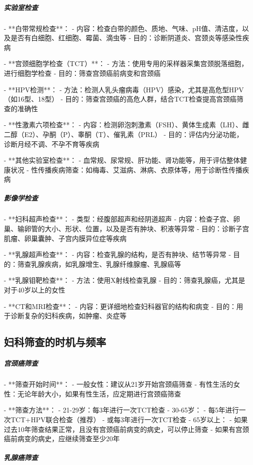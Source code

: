 \begin{enumerate}
\subparagraph{实验室检查}

- **白带常规检查**：
  - 内容：检查白带的颜色、质地、气味、pH值、清洁度，以及是否有白细胞、红细胞、霉菌、滴虫等
  - 目的：诊断阴道炎、宫颈炎等感染性疾病

- **宫颈细胞学检查（TCT）**：
  - 方法：使用专用的采样器采集宫颈脱落细胞，进行细胞学检查
  - 目的：筛查宫颈癌前病变和宫颈癌

- **HPV检测**：
  - 方法：检测人乳头瘤病毒（HPV）感染，尤其是高危型HPV（如16型、18型）
  - 目的：筛查宫颈癌的高危人群，结合TCT检查提高宫颈癌筛查的准确性

- **性激素六项检查**：
  - 内容：检测卵泡刺激素（FSH）、黄体生成素（LH）、雌二醇（E2）、孕酮（P）、睾酮（T）、催乳素（PRL）
  - 目的：评估内分泌功能，诊断月经不调、不孕不育等疾病

- **其他实验室检查**：
  - 血常规、尿常规、肝功能、肾功能等，用于评估整体健康状况
  - 性传播疾病筛查：如梅毒、艾滋病、淋病、衣原体等，用于诊断性传播疾病

\subparagraph{影像学检查}

- **妇科超声检查**：
  - 类型：经腹部超声和经阴道超声
  - 内容：检查子宫、卵巢、输卵管的大小、形状、位置，以及是否有肿块、积液等异常
  - 目的：诊断子宫肌瘤、卵巢囊肿、子宫内膜异位症等疾病

- **乳腺超声检查**：
  - 内容：检查乳腺的结构，是否有肿块、结节等异常
  - 目的：筛查乳腺疾病，如乳腺增生、乳腺纤维腺瘤、乳腺癌等

- **乳腺钼靶检查**：
  - 方法：使用X射线检查乳腺
  - 目的：筛查乳腺癌，尤其是对于40岁以上的女性

- **CT和MRI检查**：
  - 内容：更详细地检查妇科器官的结构和病变
  - 目的：用于诊断复杂的妇科疾病，如肿瘤、炎症等

\subsection{妇科筛查的时机与频率}

\subparagraph{宫颈癌筛查}

- **筛查开始时间**：
  - 一般女性：建议从21岁开始宫颈癌筛查
  - 有性生活的女性：无论年龄大小，如果有性生活，应定期进行宫颈癌筛查

- **筛查方法**：
  - 21-29岁：每3年进行一次TCT检查
  - 30-65岁：
    - 每5年进行一次TCT+HPV联合检查（推荐）
    - 或每3年进行一次TCT检查
  - 65岁以上：
    - 如果过去10年筛查结果正常，且没有宫颈癌前病变的病史，可以停止筛查
    - 如果有宫颈癌前病变的病史，应继续筛查至少20年

\subparagraph{乳腺癌筛查}


\end{enumerate}
